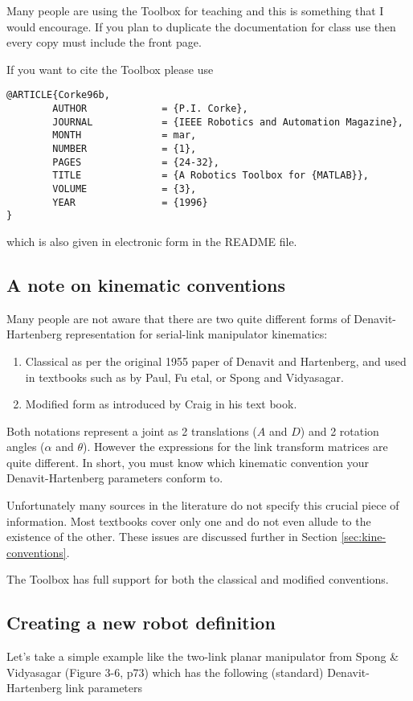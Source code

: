 \documentclass{article}
\begin{document}
Many people are using the Toolbox for teaching and this is something that
I would encourage.  If you plan to duplicate the documentation for class
use then every copy must include the front page.

If you want to cite the Toolbox please use
\begin{verbatim}
@ARTICLE{Corke96b,
        AUTHOR             = {P.I. Corke},
        JOURNAL            = {IEEE Robotics and Automation Magazine},
        MONTH              = mar,
        NUMBER             = {1},
        PAGES              = {24-32},
        TITLE              = {A Robotics Toolbox for {MATLAB}},
        VOLUME             = {3},
        YEAR               = {1996}
}
\end{verbatim}
which is also given in electronic form in the README file.

\subsection{A note on kinematic conventions}
Many people are not aware that there are two quite different forms of 
Denavit-Hartenberg representation for serial-link manipulator kinematics:
\begin{enumerate}
\item Classical as per the original 1955 paper of Denavit and Hartenberg,
and used in textbooks such as by Paul\cite{Paul81a}, Fu etal\cite{Fu87}, or 
Spong and Vidyasagar\cite{Spong89}.
\item Modified form as introduced by Craig\cite{Craig86} in his text book.
\end{enumerate}
Both notations represent a joint as 2 translations ($A$ and $D$) and 2
rotation angles 
($\alpha$ and $\theta$).  However the expressions for the link transform
matrices are quite different.  In short, you must know which kinematic
convention your Denavit-Hartenberg parameters conform to.

Unfortunately many sources in the literature do not specify this crucial
piece of information.
Most textbooks cover only one and do not even allude to the existence of the
other.
These issues are discussed further in Section \ref{sec:kine-conventions}.

The Toolbox has full support for both the classical and
modified conventions.

\subsection{Creating a new robot definition}
Let's take a simple example like the two-link planar manipulator from
Spong \& Vidyasagar\cite{Spong89} (Figure 3-6, p73) which has the following
(standard) Denavit-Hartenberg link parameters 
\end{document}
